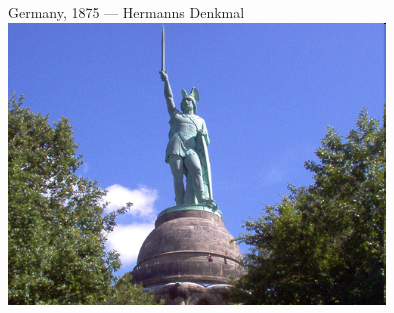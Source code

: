\begin{frame}{Germany, 1875 --- Hermanns Denkmal}
    \centering
    \includegraphics[width=0.75\textwidth]{img/herman2.png} \\
\end{frame}

%
%

